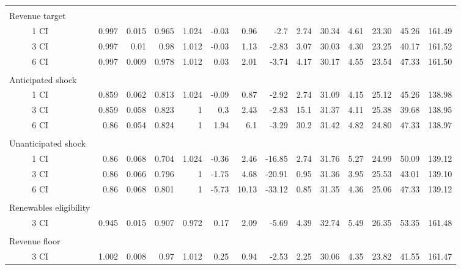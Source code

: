 \begin{tabular}{ll*{13}{r}}
&&&&&&&&&&&&&& \\ \multicolumn{2}{l}{Revenue target} &&&&&&&&&&&&&\\ & 1 CI &                    0.997 &  0.015 &  0.965 &  1.024 &                   -0.03 &   0.96 &   -2.7 &  2.74 &          30.34 &  4.61 &  23.30 &  45.26 &                 161.49 \\
              & 3 CI &                    0.997 &   0.01 &   0.98 &  1.012 &                   -0.03 &   1.13 &  -2.83 &  3.07 &          30.03 &  4.30 &  23.25 &  40.17 &                 161.52 \\
              & 6 CI &                    0.997 &  0.009 &  0.978 &  1.012 &                    0.03 &   2.01 &  -3.74 &  4.17 &          30.17 &  4.55 &  23.54 &  47.33 &                 161.50 \\
&&&&&&&&&&&&&& \\ \multicolumn{2}{l}{Anticipated shock} &&&&&&&&&&&&&\\& 1 CI &                    0.859 &  0.062 &  0.813 &  1.024 &                   -0.09 &   0.87 &  -2.92 &  2.74 &          31.09 &  4.15 &  25.12 &  45.26 &                 138.98 \\
              & 3 CI &                    0.859 &  0.058 &  0.823 &      1 &                     0.3 &   2.43 &  -2.83 &  15.1 &          31.37 &  4.11 &  25.38 &  39.68 &                 138.95 \\
              & 6 CI &                     0.86 &  0.054 &  0.824 &      1 &                    1.94 &    6.1 &  -3.29 &  30.2 &          31.42 &  4.82 &  24.80 &  47.33 &                 138.97 \\
&&&&&&&&&&&&&& \\ \multicolumn{2}{l}{Unanticipated shock} &&&&&&&&&&&&&\\ & 1 CI &                     0.86 &  0.068 &  0.704 &  1.024 &                   -0.36 &   2.46 & -16.85 &  2.74 &          31.76 &  5.27 &  24.99 &  50.09 &                 139.12 \\
              & 3 CI &                     0.86 &  0.066 &  0.796 &      1 &                   -1.75 &   4.68 & -20.91 &  0.95 &          31.36 &  3.95 &  25.53 &  43.01 &                 139.10 \\
              & 6 CI &                     0.86 &  0.068 &  0.801 &      1 &                   -5.73 &  10.13 & -33.12 &  0.85 &          31.35 &  4.36 &  25.06 &  47.33 &                 139.12 \\
&&&&&&&&&&&&&& \\ \multicolumn{2}{l}{Renewables eligibility} &&&&&&&&&&&&&\\& 3 CI &                    0.945 &  0.015 &  0.907 &  0.972 &                    0.17 &   2.09 &  -5.69 &  4.39 &          32.74 &  5.49 &  26.35 &  53.35 &                 161.48 \\
&&&&&&&&&&&&&& \\ \multicolumn{2}{l}{Revenue floor} &&&&&&&&&&&&&\\& 3 CI &                    1.002 &  0.008 &   0.97 &  1.012 &                    0.25 &   0.94 &  -2.53 &  2.25 &          30.06 &  4.35 &  23.82 &  41.55 &                 161.47 \\
\bottomrule
\end{tabular}
